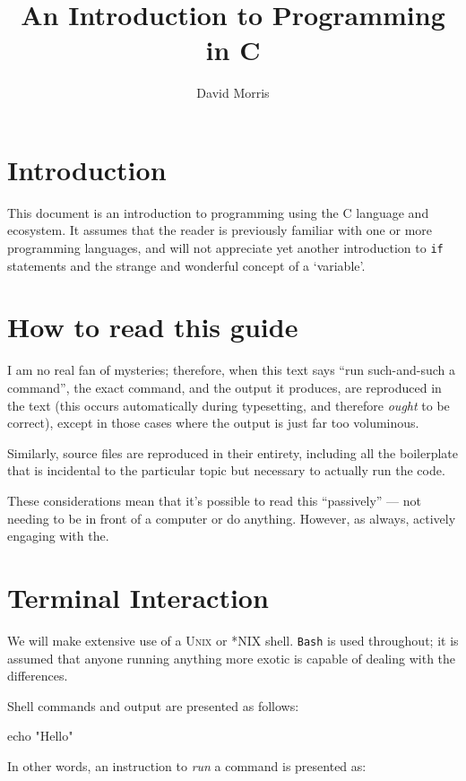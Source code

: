 \documentclass[a4paper,10pt]{article}
\title{An Introduction to Programming in C}
\author{David Morris}
\begin{document}
\maketitle

\tableofcontents

\lstlistoflistings

\section{Introduction}

This document is an introduction to programming using the C language
and ecosystem. It assumes that the reader is previously familiar with
one or more programming languages, and will not appreciate yet another
introduction to \texttt{if} statements and the strange and wonderful
concept of a `variable'.

\section{How to read this guide}

I am no real fan of mysteries; therefore, when this text says ``run
such-and-such a command'', the exact command, and the output it
produces, are reproduced in the text (this occurs automatically during
typesetting, and therefore \emph{ought} to be correct), except in
those cases where the output is just far too voluminous.

Similarly, source files are reproduced in their entirety, including
all the boilerplate that is incidental to the particular topic but
necessary to actually run the code.

These considerations mean that it's possible to read this
``passively'' --- not needing to be in front of a computer or do
anything. However, as always, actively engaging with the.

\section{Terminal Interaction}

We will make extensive use of a \textsc{Unix} or *NIX
shell. \texttt{Bash} is used throughout; it is assumed that anyone
running anything more exotic is capable of dealing with the
differences.

Shell commands and output are presented as follows:

echo "Hello"
\END

\noindent
In other words, an instruction to \emph{run} a command is presented
as:
\end{document}
